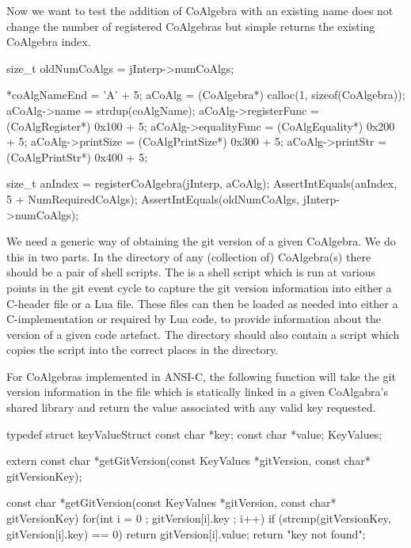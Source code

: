 Now we want to test the addition of CoAlgebra with an existing name does 
not change the number of registered CoAlgebras but simple returns the 
existing CoAlgebra index. 

\startCTest
  size_t oldNumCoAlgs  = jInterp->numCoAlgs;

  *coAlgNameEnd        = 'A' + 5;
  aCoAlg               = (CoAlgebra*) calloc(1, sizeof(CoAlgebra));
  aCoAlg->name         = strdup(coAlgName);
  aCoAlg->registerFunc = (CoAlgRegister*)  0x100 + 5;
  aCoAlg->equalityFunc = (CoAlgEquality*)  0x200 + 5;
  aCoAlg->printSize    = (CoAlgPrintSize*) 0x300 + 5;
  aCoAlg->printStr     = (CoAlgPrintStr*)  0x400 + 5;
  
  size_t anIndex = registerCoAlgebra(jInterp, aCoAlg);
  AssertIntEquals(anIndex, 5 + NumRequiredCoAlgs);
  AssertIntEquals(oldNumCoAlgs, jInterp->numCoAlgs);
\stopCTest
\stopTestCase
\stopTestSuite

\startTestSuite[getGitVersion]

We need a generic way of obtaining the git version of a given CoAlgebra. 
We do this in two parts. In the  directory of any (collection 
of) CoAlgebra(s) there should be a pair of shell scripts. The 
 is a  shell script which is run at various 
points in the git event cycle to capture the git version information into 
either a C-header file or a Lua file. These files can then be loaded as 
needed into either a C-implementation or required by Lua code, to provide 
information about the version of a given code artefact. The  
directory should also contain a   script 
which copies the  script into the correct places in the 
 directory. 

For CoAlgebras implemented in ANSI-C, the following function will take the 
git version information in the  file which is 
statically linked in a given CoAlgabra's shared library and return the 
value associated with any valid key requested. 

\startCHeader
typedef struct keyValueStruct {
  const char *key;
  const char *value;
} KeyValues;

extern const char *getGitVersion(const KeyValues *gitVersion, 
                                 const char* gitVersionKey);
\stopCHeader

\startCCode
const char *getGitVersion(const KeyValues *gitVersion,
                          const char* gitVersionKey) {
  for(int i = 0 ; gitVersion[i].key ; i++) {
    if (strcmp(gitVersionKey, gitVersion[i].key) == 0) {
      return gitVersion[i].value;
    }
  }
  return "key not found";
}
\stopCCode

